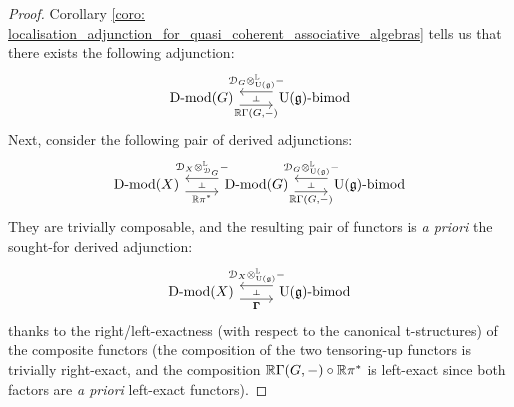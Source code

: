                     \begin{proof}
                        Corollary \ref{coro: localisation_adjunction_for_quasi_coherent_associative_algebras} tells us that there exists the following adjunction:
                            $$
                                \begin{tikzcd}
                                	{\Dmod(G)} & {\U(\g)\bimod}
                                	\arrow[""{name=0, anchor=center, inner sep=0}, "{\R\Gamma(G, -)}"', shift right=2, from=1-1, to=1-2]
                                	\arrow[""{name=1, anchor=center, inner sep=0}, "{\D_G \tensor^{\L}_{\U(\g)} -}"', shift right=2, from=1-2, to=1-1]
                                	\arrow["\dashv"{anchor=center, rotate=-90}, draw=none, from=1, to=0]
                                \end{tikzcd}
                            $$
                        Next, consider the following pair of derived adjunctions:
                            $$
                                \begin{tikzcd}
                                	{\Dmod(X)} & {\Dmod(G)} & {\U(\g)\bimod}
                                	\arrow[""{name=0, anchor=center, inner sep=0}, "{\R\pi^*}"', shift right=2, from=1-1, to=1-2]
                                	\arrow[""{name=1, anchor=center, inner sep=0}, "{\D_X \tensor^{\L}_{\D_G} -}"', shift right=2, from=1-2, to=1-1]
                                	\arrow[""{name=2, anchor=center, inner sep=0}, "{\R\Gamma(G, -)}"', shift right=2, from=1-2, to=1-3]
                                	\arrow[""{name=3, anchor=center, inner sep=0}, "{\D_G \tensor^{\L}_{\U(\g)} -}"', shift right=2, from=1-3, to=1-2]
                                	\arrow["\dashv"{anchor=center, rotate=-90}, draw=none, from=1, to=0]
                                	\arrow["\dashv"{anchor=center, rotate=-90}, draw=none, from=3, to=2]
                                \end{tikzcd}
                            $$
                        They are trivially composable, and the resulting pair of functors is \textit{a priori} the sought-for derived adjunction:
                            $$
                                \begin{tikzcd}
                                	{\Dmod(X)} & {\U(\g)\bimod}
                                	\arrow[""{name=0, anchor=center, inner sep=0}, "{\bfGamma}"', shift right=2, from=1-1, to=1-2]
                                	\arrow[""{name=1, anchor=center, inner sep=0}, "{\D_X \tensor^{\L}_{\U(\g)} -}"', shift right=2, from=1-2, to=1-1]
                                	\arrow["\dashv"{anchor=center, rotate=-90}, draw=none, from=1, to=0]
                                \end{tikzcd}
                            $$   
                        thanks to the right/left-exactness (with respect to the canonical t-structures) of the composite functors (the composition of the two tensoring-up functors is trivially right-exact, and the composition $\mathbb{R}\Gamma(G, -) \circ \mathbb{R}\pi^*$ is left-exact since both factors are \textit{a priori} left-exact functors).  
                    \end{proof}
